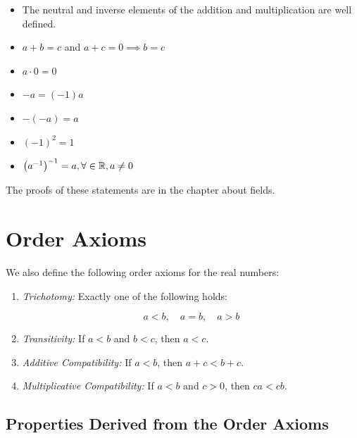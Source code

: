 \begin{itemize}

	\item The neutral and inverse elements of the addition and multiplication are well defined.

	\item \(a + b = c\) and \(a + c = 0 \implies b = c\)

	\item \(a \cdot 0 = 0\)

	\item \(-a = (-1)a\)

	\item \(-(-a) = a\)

	\item \((-1)^2 = 1\)

	\item \(\left(a^{-1}\right)^{-1} = a, \forall \in \mathbb{R}, a \ne 0\)

\end{itemize}

The proofs of these statements are in the chapter about fields.

\section{Order Axioms}

We also define the following order axioms for the real numbers:

\begin{enumerate}[label=\Roman*.]

	\item \emph{Trichotomy:} Exactly one of the following holds:

	      \[
		      a < b, \quad a = b, \quad a > b
	      \]

	\item \emph{Transitivity:} If \( a < b \) and \( b < c \), then \( a < c \).

	\item \emph{Additive Compatibility:} If \( a < b \), then \( a + c < b + c \).

	\item \emph{Multiplicative Compatibility:} If \( a < b \) and \( c > 0 \), then \( ca < cb \).

\end{enumerate}

\subsection{Properties Derived from the Order Axioms}

